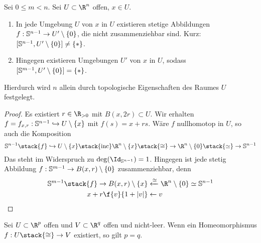 \begin{st}
	Sei $0 \le m < n$.
	Sei $U \subset \R^n$ offen, $x \in U$.
	\begin{enumerate}[(1)]
		\item
			In jede Umgebung $U$ von $x$ in $U$ existieren stetige Abbildungen $f: \S^{n-1} \to U' \setminus \{0\}$, die nicht zusammenziehbar sind.
			Kurz: $[\S^{n-1}, U' \setminus \{0\}] \neq \{*\}$.
		\item
			Hingegen existieren Umgebungen $U'$ von $x$ in $U$, sodass $[\S^{m-1}, U' \setminus \{0\}] = \{*\}$.
	\end{enumerate}
	Hierdurch wird $n$ allein durch topologische Eigenschaften des Raumes $U$ festgelegt.
	\begin{proof}
		Es existiert $r \in \R_{>0}$ mit $B(x, 2r) \subset U$.
		Wir erhalten $f = f_{x,r} : \S^{n-1} \injto U \setminus \{x\}$ mit $f(s) = x + rs$.
		Wäre $f$ nullhomotop in $U$, so auch die Komposition
		\[
			\S^{n-1} \stack{f}\injto U \setminus \{x\} \stack{\mathrm{inc}} \R^n \setminus \{x\} \stack{\homeomorphic}\to \R^n \setminus \{0\} \stack{\homotopic}\to \S^{n-1}
		\]
		Das steht im Widerspruch zu $\deg(\Id_{\S^{n-1}}) = 1$.
		Hingegen ist jede stetig Abbildung $f: \S^{m-1} \to B(x, r) \setminus \{0\}$ zusammenziehbar, denn
		\begin{align*}
			\S^{m-1} \stack{f}\to B(x,r) \setminus \{x\} & \xleftarrow{\homeomorphic} \R^n \setminus \{0\} \homotopic \S^{n-1} \\
			x + r \f {v}{1+|v|} & \leftarrow v
		\end{align*}
	\end{proof}
\end{st}

\begin{st}
	Sei $U \subset \R^p$ offen und $V \subset \R^q$ offen und nicht-leer.
	Wenn ein Homeomorphismus $f: U \stack{\homeomorphic}\to V$ existiert, so gilt $p = q$.
\end{st}


